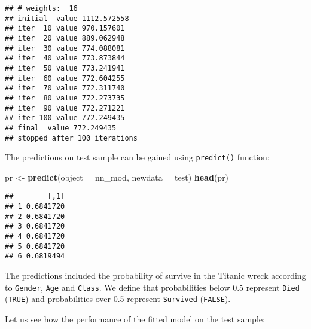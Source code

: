 \documentclass[]{book}
\newenvironment{Shaded}{\begin{snugshade}}{\end{snugshade}}
\newcommand{\KeywordTok}[1]{\textcolor[rgb]{0.13,0.29,0.53}{\textbf{{#1}}}}
\newcommand{\DataTypeTok}[1]{\textcolor[rgb]{0.13,0.29,0.53}{{#1}}}
\newcommand{\DecValTok}[1]{\textcolor[rgb]{0.00,0.00,0.81}{{#1}}}
\newcommand{\StringTok}[1]{\textcolor[rgb]{0.31,0.60,0.02}{{#1}}}
\newcommand{\NormalTok}[1]{{#1}}
\begin{document}
\begin{verbatim}
## # weights:  16
## initial  value 1112.572558 
## iter  10 value 970.157601
## iter  20 value 889.062948
## iter  30 value 774.088081
## iter  40 value 773.873844
## iter  50 value 773.241941
## iter  60 value 772.604255
## iter  70 value 772.311740
## iter  80 value 772.273735
## iter  90 value 772.271221
## iter 100 value 772.249435
## final  value 772.249435 
## stopped after 100 iterations
\end{verbatim}

The predictions on test sample can be gained using \texttt{predict()}
function:

\begin{Shaded}
\begin{Highlighting}[]
\NormalTok{pr <-}\StringTok{ }\KeywordTok{predict}\NormalTok{(}\DataTypeTok{object =} \NormalTok{nn_mod, }\DataTypeTok{newdata =} \NormalTok{test)}
\KeywordTok{head}\NormalTok{(pr)}
\end{Highlighting}
\end{Shaded}

\begin{verbatim}
##        [,1]
## 1 0.6841720
## 2 0.6841720
## 3 0.6841720
## 4 0.6841720
## 5 0.6841720
## 6 0.6819494
\end{verbatim}

The predictions included the probability of survive in the Titanic wreck
according to \texttt{Gender}, \texttt{Age} and \texttt{Class}. We define
that probabilities below 0.5 represent \texttt{Died} (\texttt{TRUE}) and
probabilities over 0.5 represent \texttt{Survived} (\texttt{FALSE}).

\begin{Shaded}
\end{Shaded}

Let us see how the performance of the fitted model on the test sample:

\begin{Shaded}
\end{Shaded}
\end{document}
